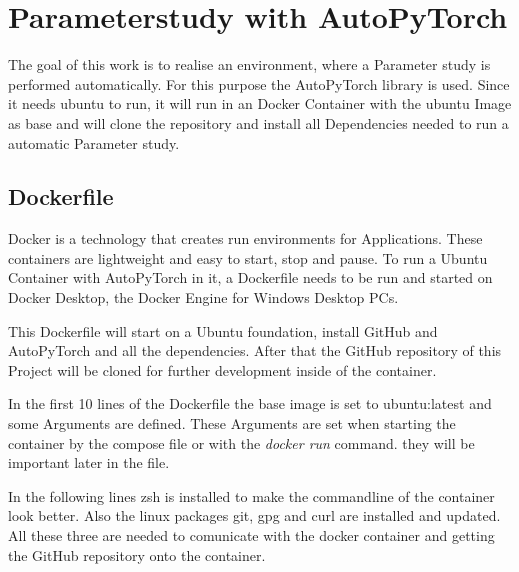 \documentclass[a4paper, 12pt, oneside]{scrbook}
\begin{document}
		\section{Parameterstudy with AutoPyTorch}
		
		\noindent The goal of this work is to realise an environment, where a Parameter study is performed automatically. For this purpose the AutoPyTorch library is used. Since it needs ubuntu to run, it will run in an Docker Container with the ubuntu Image as base and will clone the repository and install all Dependencies needed to run a automatic Parameter study.
		
		\subsection{Dockerfile}
		
		\noindent Docker is a technology that creates run environments for Applications. These containers are lightweight and easy to start, stop and pause. To run a Ubuntu Container with AutoPyTorch in it, a Dockerfile needs to be run and started on Docker Desktop, the Docker Engine for Windows Desktop PCs.
		
		\noindent This Dockerfile will start on a Ubuntu foundation, install GitHub and AutoPyTorch and all the dependencies. After that the GitHub repository of this Project will be cloned for further development inside of the container. 
		
		\noindent In the first 10 lines of the Dockerfile the base image is set to ubuntu:latest and some Arguments are defined. These Arguments are set when starting the container by the compose file or with the \textit{docker run} command. they will be important later in the file. 
		
		
		\noindent 
		
		\noindent In the following lines zsh is installed to make the commandline of the container look better. Also the linux packages git, gpg and curl are installed and updated. All these three are needed to comunicate with the docker container and getting the GitHub repository onto the container.  
		
		\noindent 
		
		\noindent 
		
\end{document}
